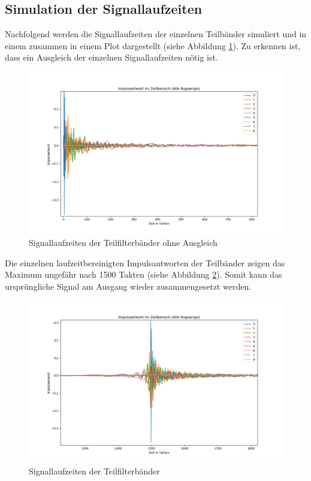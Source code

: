 \subsection{Simulation der Signallaufzeiten}
Nachfolgend werden die Signallaufzeiten der einzelnen Teilbänder simuliert und in einem zusammen in einem Plot dargestellt (siehe Abbildung \ref{fig:TeilbandLaufzeitenohne}). Zu erkennen ist, dass ein Ausgleich der einzelnen Signallaufzeiten nötig ist.\par
\begin{figure}[h!]
	\centering	\includegraphics[width=15cm]{img/bank_zeit_alle_keinAusgleich.png}
	\caption{Signallaufzeiten der Teilfilterbänder ohne Ausgleich}
	\label{fig:TeilbandLaufzeitenohne}
\end{figure}
Die einzelnen laufzeitbereinigten Impulsantworten der Teilbänder zeigen das Maximum ungefähr nach 1500 Takten (siehe Abbildung \ref{fig:TeilbandLaufzeiten}). Somit kann das ursprüngliche Signal am Ausgang wieder zusammengesetzt werden.
\begin{figure}[h!]
	\centering	\includegraphics[width=15cm]{img/bank_zeit_alle.png}
	\caption{Signallaufzeiten der Teilfilterbänder}
	\label{fig:TeilbandLaufzeiten}
\end{figure}

